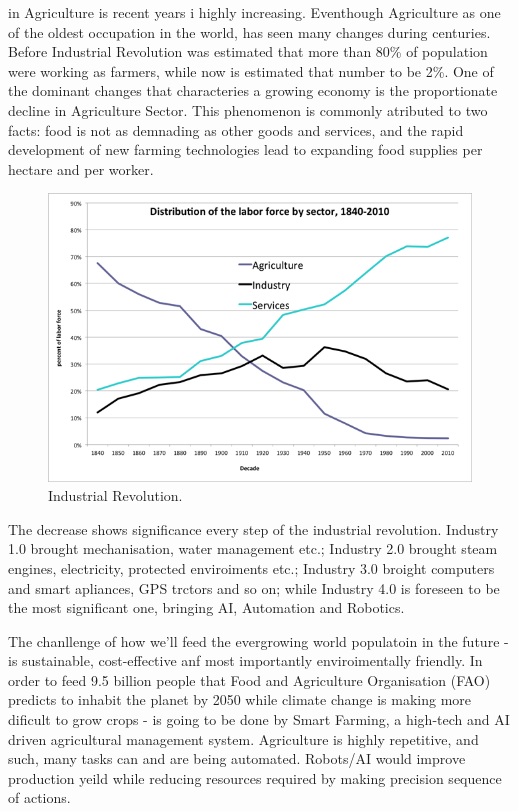\documentclass[10pt,journal,compsoc]{IEEEtran}
\begin{document}
 in Agriculture is recent years i highly increasing. Eventhough Agriculture as one of the oldest occupation in the world, has seen many changes during centuries. Before Industrial Revolution was estimated that more than 80\% of population were working as farmers, while now is estimated that number to be 2\%. One of the dominant changes that characteries a growing economy is the proportionate decline in Agriculture Sector. This phenomenon is commonly atributed to two facts: food is not as demnading as other goods and services, and the rapid development of new farming technologies lead to expanding food supplies per hectare and per worker.
\begin{figure}[thpb]
      \centering
      \includegraphics[width=\linewidth]{agridecline}
      \caption{Industrial Revolution.}
      \label{fig:robot1}
\end{figure}

The decrease shows significance every step of the industrial revolution. Industry 1.0 brought mechanisation, water management etc.; Industry 2.0 brought steam engines, electricity, protected enviroiments etc.; Industry 3.0 broight computers and smart apliances, GPS trctors and so on; while Industry 4.0 is foreseen to be the most significant one, bringing AI, Automation and Robotics.

The chanllenge of how we'll feed the evergrowing world populatoin in the future - is sustainable, cost-effective anf most importantly enviroimentally friendly. In order to feed 9.5 billion people that Food and Agriculture Organisation (FAO) predicts to inhabit the planet by 2050 while climate change is making more dificult to grow crops - is going to be done by Smart Farming, a high-tech and AI driven agricultural management system. Agriculture is highly repetitive, and such, many tasks can and are being automated. Robots/AI would improve production yeild while reducing resources required by making precision sequence of actions.
\end{document}
